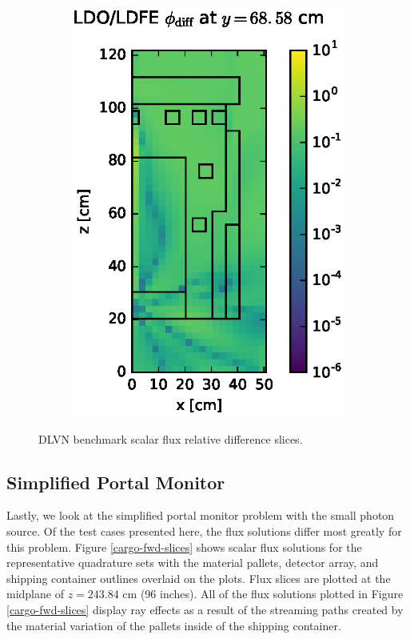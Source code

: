 \documentclass{article} %
\begin{document}
\begin{figure}[!hbt]
\begin{subfigure}{0.4\textwidth}
\includegraphics[max height=0.445\textheight]
{img/dlvn-flux-diff-ldfe.eps}
\end{subfigure}
\caption{DLVN benchmark scalar flux relative difference slices.}
\label{dlvn-fwd-diff-rel}
\end{figure}

\FloatBarrier
\subsection{Simplified Portal Monitor}

Lastly, we look at the simplified portal monitor problem with the small photon
source. Of the test cases presented here, the flux solutions differ most
greatly for this problem. Figure \ref{cargo-fwd-slices} shows scalar flux
solutions for the representative quadrature sets with the material pallets,
detector array, and shipping container outlines overlaid on the plots. Flux
slices are plotted at the midplane of $z = 243.84$ cm (96 inches). All of the
flux solutions plotted in Figure \ref{cargo-fwd-slices} display ray effects
as a result of the streaming paths created by the material variation of the
pallets inside of the shipping container.
\end{document}
